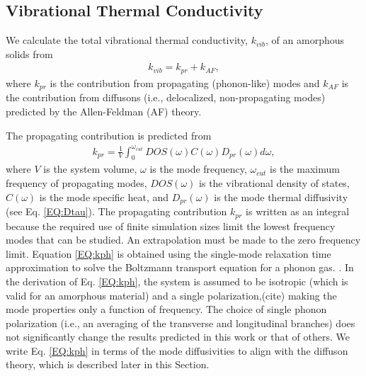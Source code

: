 \documentclass[aps,prb,onecolumn,preprint,superscriptaddress,footinbib,amsmath,amssymb,floatfix]{revtex4}
\begin{document}
\subsection{\label{S:Theory:Thermal}Vibrational Thermal Conductivity}

We calculate the total vibrational thermal conductivity, $k_{vib}$, 
of an amorphous solids from 
\begin{equation}\label{EQ:kvib}
\begin{split}
k_{vib} = k_{pr} + k_{AF},
\end{split}
\end{equation}
where $k_{pr}$\cite{ashcroft_solid_1976,dove_introduction_1993,
ziman_electrons_2001} is the contribution from 
propagating (phonon-like) modes and $k_{AF}$ is the contribution 
from diffusons (i.e., delocalized, non-propagating modes) predicted 
by the Allen-Feldman (AF) theory.\cite{feldman_thermal_1993} 

The propagating contribution is predicted from
\cite{feldman_thermal_1993,feldman_numerical_1999}  
\begin{equation}\label{EQ:kph}
\begin{split}
k_{pr} = \frac{1}{V}\int_{0}^{\omega_{cut}} 
DOS(\omega) C(\omega) D_{pr}(\omega)d\omega,
\end{split}
\end{equation}
where $V$ is the system volume, $\omega$ is the mode 
frequency, $\omega_{cut}$ is the maximum frequency of propagating 
modes,  
$DOS(\omega)$ is the vibrational 
density of states, $C(\omega)$ is the mode specific heat, 
and $D_{pr}(\omega)$ is the mode thermal diffusivity 
(see Eq. \eqref{EQ:Dtau}).\cite{feldman_thermal_1993} 
The propagating contribution $k_{pr}$ is written as an integral 
because the required use of finite simulation sizes
\cite{feldman_thermal_1993,feldman_numerical_1999} 
limit the lowest frequency 
modes that can be studied. An extrapolation 
must be made to the zero frequency limit.
\cite{feldman_thermal_1993,cahill_thermal_1994,
baldi_thermal_2008,yang_anomalously_2010}    
Equation \eqref{EQ:kph} is obtained using the single-mode relaxation
time approximation to solve 
the Boltzmann transport equation for a phonon gas.
\cite{ziman_electrons_2001}. In the derivation of Eq. 
\eqref{EQ:kph}, the system is assumed to be isotropic 
(which is valid for an amorphous material) 
and a single polarization,(cite) making the mode 
properties only a function of frequency. The 
choice of single phonon polarization (i.e., an averaging 
of the transverse and longitudinal branches) 
does not significantly change the results predicted in this work  
or that of others.
\cite{feldman_thermal_1993,cahill_thermal_1994,
feldman_numerical_1999,baldi_thermal_2008,liu_high_2009,
yang_anomalously_2010} We write Eq. \eqref{EQ:kph} in terms of the 
mode diffusivities to align with the diffuson theory,
\cite{feldman_thermal_1993} which 
is described later in this Section. 
\end{document}
